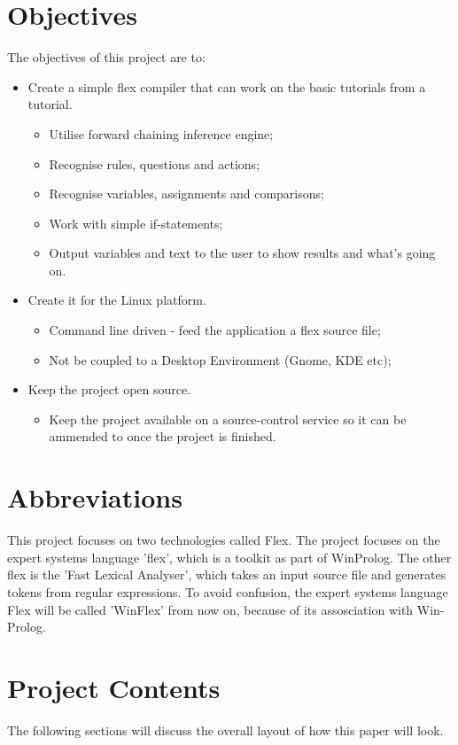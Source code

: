 \documentclass[12pt]{report}
\begin{document}
\section{Objectives}\label{sec:objectives}
The objectives of this project are to:
\begin{itemize}
\item Create a simple flex compiler that can work on the basic tutorials from a tutorial.
	\begin{itemize}
	\item Utilise forward chaining inference engine;
	\item Recognise rules, questions and actions;
	\item Recognise variables, assignments and comparisons;
	\item Work with simple if-statements;
	\item Output variables and text to the user to show results and what's going on.
	\end{itemize}
\item Create it for the Linux platform.
	\begin{itemize}
	\item Command line driven - feed the application a flex source file;
	\item Not be coupled to a Desktop Environment (Gnome, KDE etc);
	\end{itemize}
\item Keep the project open source.
	\begin{itemize}
	\item Keep the project available on a source-control service so it can be ammended to once the project is finished.
	\end{itemize}
\end{itemize}
\clearpage
\section{Abbreviations}\label{sec:abbreviations}
This project focuses on two technologies called Flex.  The project focuses on the expert systems language 'flex', which is a toolkit as part of WinProlog.  The other flex is the 'Fast Lexical Analyser', which takes an input source file and generates tokens from regular expressions.  To avoid confusion, the expert systems language Flex will be called 'WinFlex' from now on, because of its assosciation with Win-Prolog.
\section{Project Contents}\label{sec:project_contents}
The following sections will discuss the overall layout of how this paper will look.
\end{document}
